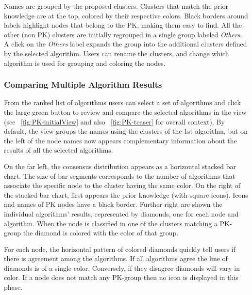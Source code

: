 
Names are grouped by the proposed clusters. Clusters that match the prior knowledge are at the top, colored by their respective colors.  Black borders around labels highlight nodes that belong to the PK, making them easy to find.   All the other (non PK) clusters are initially regrouped in a single group labeled \textit{Others}.
A click on the \textit{Others} label expands the group into the additional clusters defined by the selected algorithm.
Users can rename the clusters, and change which algorithm is used for grouping and coloring the nodes.

\subsubsection{Comparing Multiple Algorithm Results}

From the ranked list of algorithms users can select a set of algorithms and click the large green button to review and compare the selected algorithms in the \paovis view (see ~\autoref{fig:PK-initialView}
and also ~\autoref{fig:PK-teaser} for overall context). By default, the \paovis view groups the names using the clusters of the 1st algorithm, but on the left of the node names now appears complementary information about the results of all the selected algorithms.

On the far left, the consensus distribution appears as a horizontal stacked bar chart. The size of bar segments corresponds to the number of algorithms that associate the specific node to the cluster having the same color. On the right of the stacked bar chart, first appears the prior knowledge (with square icons). Icons and names of PK nodes have a black border. Further right are shown the individual algorithms' results, represented by diamonds, one for each node and algorithm. When the node is classified in one of the clusters matching a PK-group the diamond is colored with the color of that group.


For each node, the horizontal pattern of colored diamonds quickly tell users if there is agreement among the algorithms. If all algorithms agree the line of diamonds is of a single color. Conversely, if they disagree diamonds will vary in color. If a node does not match any PK-group then no icon is displayed in this phase.

